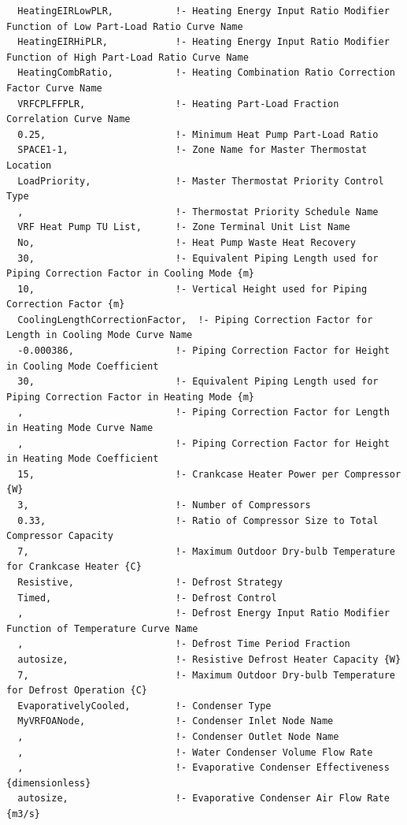 \begin{lstlisting}
  HeatingEIRLowPLR,           !- Heating Energy Input Ratio Modifier Function of Low Part-Load Ratio Curve Name
  HeatingEIRHiPLR,            !- Heating Energy Input Ratio Modifier Function of High Part-Load Ratio Curve Name
  HeatingCombRatio,           !- Heating Combination Ratio Correction Factor Curve Name
  VRFCPLFFPLR,                !- Heating Part-Load Fraction Correlation Curve Name
  0.25,                       !- Minimum Heat Pump Part-Load Ratio
  SPACE1-1,                   !- Zone Name for Master Thermostat Location
  LoadPriority,               !- Master Thermostat Priority Control Type
  ,                           !- Thermostat Priority Schedule Name
  VRF Heat Pump TU List,      !- Zone Terminal Unit List Name
  No,                         !- Heat Pump Waste Heat Recovery
  30,                         !- Equivalent Piping Length used for Piping Correction Factor in Cooling Mode {m}
  10,                         !- Vertical Height used for Piping Correction Factor {m}
  CoolingLengthCorrectionFactor,  !- Piping Correction Factor for Length in Cooling Mode Curve Name
  -0.000386,                  !- Piping Correction Factor for Height in Cooling Mode Coefficient
  30,                         !- Equivalent Piping Length used for Piping Correction Factor in Heating Mode {m}
  ,                           !- Piping Correction Factor for Length in Heating Mode Curve Name
  ,                           !- Piping Correction Factor for Height in Heating Mode Coefficient
  15,                         !- Crankcase Heater Power per Compressor {W}
  3,                          !- Number of Compressors
  0.33,                       !- Ratio of Compressor Size to Total Compressor Capacity
  7,                          !- Maximum Outdoor Dry-bulb Temperature for Crankcase Heater {C}
  Resistive,                  !- Defrost Strategy
  Timed,                      !- Defrost Control
  ,                           !- Defrost Energy Input Ratio Modifier Function of Temperature Curve Name
  ,                           !- Defrost Time Period Fraction
  autosize,                   !- Resistive Defrost Heater Capacity {W}
  7,                          !- Maximum Outdoor Dry-bulb Temperature for Defrost Operation {C}
  EvaporativelyCooled,        !- Condenser Type
  MyVRFOANode,                !- Condenser Inlet Node Name
  ,                           !- Condenser Outlet Node Name
  ,                           !- Water Condenser Volume Flow Rate
  ,                           !- Evaporative Condenser Effectiveness {dimensionless}
  autosize,                   !- Evaporative Condenser Air Flow Rate {m3/s}

\end{lstlisting}
